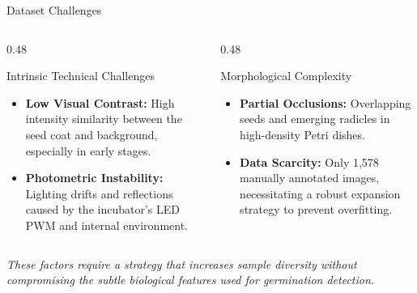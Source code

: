 \documentclass[aspectratio=169]{beamer}
\begin{document}
\begin{frame}{Dataset Challenges}
    \begin{columns}[T]
        \begin{column}{0.48\textwidth}
            \begin{alertblock}{Intrinsic Technical Challenges}
                \footnotesize
                \begin{itemize}
                    \item \textbf{Low Visual Contrast:} High intensity similarity between the seed coat and background, especially in early stages.
                    \item \textbf{Photometric Instability:} Lighting drifts and reflections caused by the incubator's LED PWM and internal environment.
                \end{itemize}
            \end{alertblock}
        \end{column}
        
        \begin{column}{0.48\textwidth}
            \begin{alertblock}{Morphological Complexity}
                \footnotesize
                \begin{itemize}
                    \item \textbf{Partial Occlusions:} Overlapping seeds and emerging radicles in high-density Petri dishes.
                    \item \textbf{Data Scarcity:} Only 1,578 manually annotated images, necessitating a robust expansion strategy to prevent overfitting.
                \end{itemize}
            \end{alertblock}
        \end{column}
    \end{columns}
    \vspace{0.4cm}
    \centering
    \scriptsize
    \textit{These factors require a strategy that increases sample diversity without compromising the subtle biological features used for germination detection.}
\end{frame}
\end{document}
